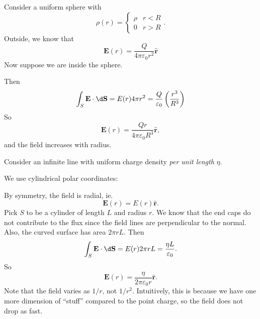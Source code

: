 \documentclass[a4paper]{article}
\begin{document}
\begin{eg}
  Consider a uniform sphere with
  \[
    \rho (r) = \begin{cases}
      \rho & r < R\\
      0 & r > R
    \end{cases}.
  \]
  Outside, we know that
  \[
    \mathbf{E}(r) = \frac{Q}{4\pi\varepsilon_0 r^2}\hat{\mathbf{r}}
  \]
  Now suppose we are inside the sphere.
  \begin{center}
  \end{center}
  Then
  \[
    \int_S \mathbf{E}\cdot \d\mathbf{S} = E(r) 4\pi r^2 = \frac{Q}{\varepsilon_0}\left(\frac{r^3}{R^3}\right)
  \]
  So
  \[
    \mathbf{E}(r) = \frac{Qr}{4\pi\varepsilon_0 R^3}\hat{\mathbf{r}},
  \]
  and the field increases with radius.
\end{eg}

\begin{eg}
  Consider an infinite line with uniform charge density \emph{per unit length} $\eta$.

  We use cylindrical polar coordinates:
  \begin{center}
  \end{center}
  By symmetry, the field is radial, ie.
  \[
    \mathbf{E}(r) = E(r) \hat{\mathbf{r}}.
  \]
  Pick $S$ to be a cylinder of length $L$ and radius $r$. We know that the end caps do not contribute to the flux since the field lines are perpendicular to the normal. Also, the curved surface has area $2\pi rL$. Then
  \[
    \int_S\mathbf{E}\cdot \d\mathbf{S} = E(r)2\pi rL = \frac{\eta L}{\varepsilon_0}.
  \]
  So
  \[
    \mathbf{E}(r) = \frac{\eta}{2\pi \varepsilon_0 r} \hat{\mathbf{r}}.
  \]
  Note that the field varies as $1/r$, not $1/r^2$. Intuitively, this is because we have one more dimension of ``stuff'' compared to the point charge, so the field does not drop as fast.
\end{eg}
\end{document}
